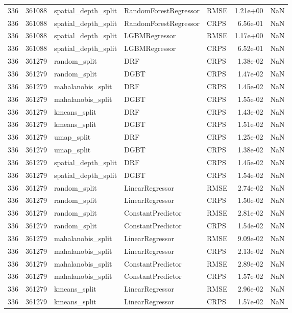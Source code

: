 \begin{tabular}{rrlllrr}
336 & 361088 & spatial\_depth\_split & RandomForestRegressor & RMSE & 1.21e+00 & NaN \\
336 & 361088 & spatial\_depth\_split & RandomForestRegressor & CRPS & 6.56e-01 & NaN \\
336 & 361088 & spatial\_depth\_split & LGBMRegressor & RMSE & 1.17e+00 & NaN \\
336 & 361088 & spatial\_depth\_split & LGBMRegressor & CRPS & 6.52e-01 & NaN \\
336 & 361279 & random\_split & DRF & CRPS & 1.38e-02 & NaN \\
336 & 361279 & random\_split & DGBT & CRPS & 1.47e-02 & NaN \\
336 & 361279 & mahalanobis\_split & DRF & CRPS & 1.45e-02 & NaN \\
336 & 361279 & mahalanobis\_split & DGBT & CRPS & 1.55e-02 & NaN \\
336 & 361279 & kmeans\_split & DRF & CRPS & 1.43e-02 & NaN \\
336 & 361279 & kmeans\_split & DGBT & CRPS & 1.51e-02 & NaN \\
336 & 361279 & umap\_split & DRF & CRPS & 1.25e-02 & NaN \\
336 & 361279 & umap\_split & DGBT & CRPS & 1.38e-02 & NaN \\
336 & 361279 & spatial\_depth\_split & DRF & CRPS & 1.45e-02 & NaN \\
336 & 361279 & spatial\_depth\_split & DGBT & CRPS & 1.54e-02 & NaN \\
336 & 361279 & random\_split & LinearRegressor & RMSE & 2.74e-02 & NaN \\
336 & 361279 & random\_split & LinearRegressor & CRPS & 1.50e-02 & NaN \\
336 & 361279 & random\_split & ConstantPredictor & RMSE & 2.81e-02 & NaN \\
336 & 361279 & random\_split & ConstantPredictor & CRPS & 1.54e-02 & NaN \\
336 & 361279 & mahalanobis\_split & LinearRegressor & RMSE & 9.09e-02 & NaN \\
336 & 361279 & mahalanobis\_split & LinearRegressor & CRPS & 2.13e-02 & NaN \\
336 & 361279 & mahalanobis\_split & ConstantPredictor & RMSE & 2.89e-02 & NaN \\
336 & 361279 & mahalanobis\_split & ConstantPredictor & CRPS & 1.57e-02 & NaN \\
336 & 361279 & kmeans\_split & LinearRegressor & RMSE & 2.96e-02 & NaN \\
336 & 361279 & kmeans\_split & LinearRegressor & CRPS & 1.57e-02 & NaN \\

\end{tabular}
